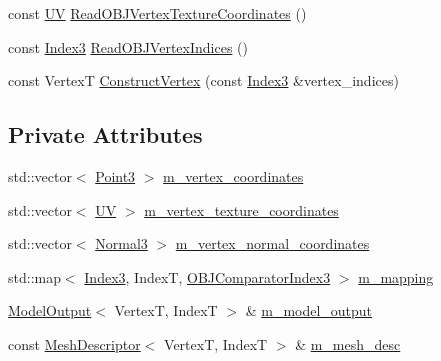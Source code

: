 \begin{DoxyCompactItemize}
\item 
const \hyperlink{structmage_1_1_u_v}{UV} \hyperlink{classmage_1_1loader_1_1_o_b_j_reader_acb7b69622e6dbd85149377819ae8b997}{Read\+O\+B\+J\+Vertex\+Texture\+Coordinates} ()
\item 
const \hyperlink{classmage_1_1loader_1_1_o_b_j_reader_af9aab131e88c5a3a0f29b156c4c97096}{Index3} \hyperlink{classmage_1_1loader_1_1_o_b_j_reader_a0647bb9573512a480125744c0f100618}{Read\+O\+B\+J\+Vertex\+Indices} ()
\item 
const VertexT \hyperlink{classmage_1_1loader_1_1_o_b_j_reader_ac78fe5537ba2d3098a9f0a8858893dd3}{Construct\+Vertex} (const \hyperlink{classmage_1_1loader_1_1_o_b_j_reader_af9aab131e88c5a3a0f29b156c4c97096}{Index3} \&vertex\+\_\+indices)
\end{DoxyCompactItemize}
\subsection*{Private Attributes}
\begin{DoxyCompactItemize}
\item 
std\+::vector$<$ \hyperlink{structmage_1_1_point3}{Point3} $>$ \hyperlink{classmage_1_1loader_1_1_o_b_j_reader_adf05a751f03eeaccccf496710be4cae9}{m\+\_\+vertex\+\_\+coordinates}
\item 
std\+::vector$<$ \hyperlink{structmage_1_1_u_v}{UV} $>$ \hyperlink{classmage_1_1loader_1_1_o_b_j_reader_a9025e0039c3c4d7e25bf40dc0f4431c0}{m\+\_\+vertex\+\_\+texture\+\_\+coordinates}
\item 
std\+::vector$<$ \hyperlink{structmage_1_1_normal3}{Normal3} $>$ \hyperlink{classmage_1_1loader_1_1_o_b_j_reader_a344094087b3f0978c599970e35f77aac}{m\+\_\+vertex\+\_\+normal\+\_\+coordinates}
\item 
std\+::map$<$ \hyperlink{classmage_1_1loader_1_1_o_b_j_reader_af9aab131e88c5a3a0f29b156c4c97096}{Index3}, IndexT, \hyperlink{structmage_1_1loader_1_1_o_b_j_reader_1_1_o_b_j_comparator_index3}{O\+B\+J\+Comparator\+Index3} $>$ \hyperlink{classmage_1_1loader_1_1_o_b_j_reader_a4538c827571318be8563ba44974791ee}{m\+\_\+mapping}
\item 
\hyperlink{structmage_1_1_model_output}{Model\+Output}$<$ VertexT, IndexT $>$ \& \hyperlink{classmage_1_1loader_1_1_o_b_j_reader_a19ba3dbb5f6d5a7090d6b2cf12a4979a}{m\+\_\+model\+\_\+output}
\item 
const \hyperlink{classmage_1_1_mesh_descriptor}{Mesh\+Descriptor}$<$ VertexT, IndexT $>$ \& \hyperlink{classmage_1_1loader_1_1_o_b_j_reader_ab0da26407762a9322c0d65b8960cb0f9}{m\+\_\+mesh\+\_\+desc}
\end{DoxyCompactItemize}



